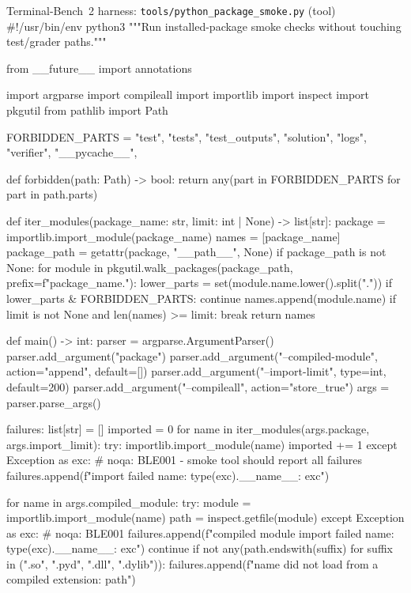 \begin{promptbox}{Terminal-Bench~2 harness: \texttt{tools/python\_package\_smoke.py} (tool)}
#!/usr/bin/env python3
"""Run installed-package smoke checks without touching test/grader paths."""

from __future__ import annotations

import argparse
import compileall
import importlib
import inspect
import pkgutil
from pathlib import Path


FORBIDDEN_PARTS = {
    "test",
    "tests",
    "test_outputs",
    "solution",
    "logs",
    "verifier",
    "__pycache__",
}


def forbidden(path: Path) -> bool:
    return any(part in FORBIDDEN_PARTS for part in path.parts)


def iter_modules(package_name: str, limit: int | None) -> list[str]:
    package = importlib.import_module(package_name)
    names = [package_name]
    package_path = getattr(package, "__path__", None)
    if package_path is not None:
        for module in pkgutil.walk_packages(package_path, prefix=f"{package_name}."):
            lower_parts = set(module.name.lower().split("."))
            if lower_parts & FORBIDDEN_PARTS:
                continue
            names.append(module.name)
            if limit is not None and len(names) >= limit:
                break
    return names


def main() -> int:
    parser = argparse.ArgumentParser()
    parser.add_argument("package")
    parser.add_argument("--compiled-module", action="append", default=[])
    parser.add_argument("--import-limit", type=int, default=200)
    parser.add_argument("--compileall", action="store_true")
    args = parser.parse_args()

    failures: list[str] = []
    imported = 0
    for name in iter_modules(args.package, args.import_limit):
        try:
            importlib.import_module(name)
            imported += 1
        except Exception as exc:  # noqa: BLE001 - smoke tool should report all failures
            failures.append(f"import failed {name}: {type(exc).__name__}: {exc}")

    for name in args.compiled_module:
        try:
            module = importlib.import_module(name)
            path = inspect.getfile(module)
        except Exception as exc:  # noqa: BLE001
            failures.append(f"compiled module import failed {name}: {type(exc).__name__}: {exc}")
            continue
        if not any(path.endswith(suffix) for suffix in (".so", ".pyd", ".dll", ".dylib")):
            failures.append(f"{name} did not load from a compiled extension: {path}")


\end{promptbox}
